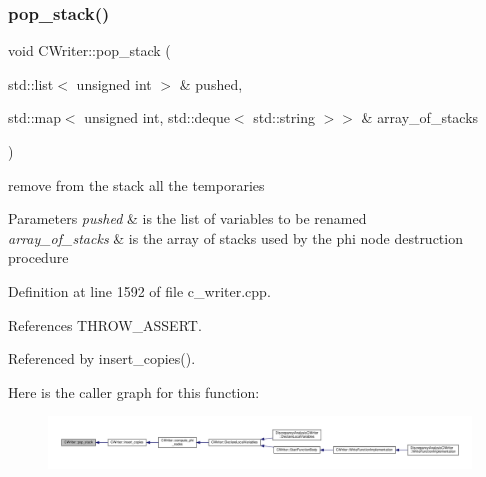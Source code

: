\subsubsection{\texorpdfstring{pop\+\_\+stack()}{pop\_stack()}}
{\footnotesize\ttfamily void C\+Writer\+::pop\+\_\+stack (\begin{DoxyParamCaption}\item[{std\+::list$<$ unsigned int $>$ \&}]{pushed,  }\item[{std\+::map$<$ unsigned int, std\+::deque$<$ std\+::string $>$$>$ \&}]{array\+\_\+of\+\_\+stacks }\end{DoxyParamCaption})\hspace{0.3cm}{\ttfamily [protected]}}



remove from the stack all the temporaries 


\begin{DoxyParams}{Parameters}
{\em pushed} & is the list of variables to be renamed \\
\hline
{\em array\+\_\+of\+\_\+stacks} & is the array of stacks used by the phi node destruction procedure \\
\hline
\end{DoxyParams}


Definition at line 1592 of file c\+\_\+writer.\+cpp.



References T\+H\+R\+O\+W\+\_\+\+A\+S\+S\+E\+RT.



Referenced by insert\+\_\+copies().

Here is the caller graph for this function\+:
\nopagebreak
\begin{figure}[H]
\begin{center}
\leavevmode
\includegraphics[width=350pt]{d3/d59/classCWriter_ab9ea6f81d49ce7fed0fa00ffc7e19219_icgraph}
\end{center}
\end{figure}
\mbox{\label{classCWriter_a5c0ed4b874e669318fef1e5976e24b52}} 
